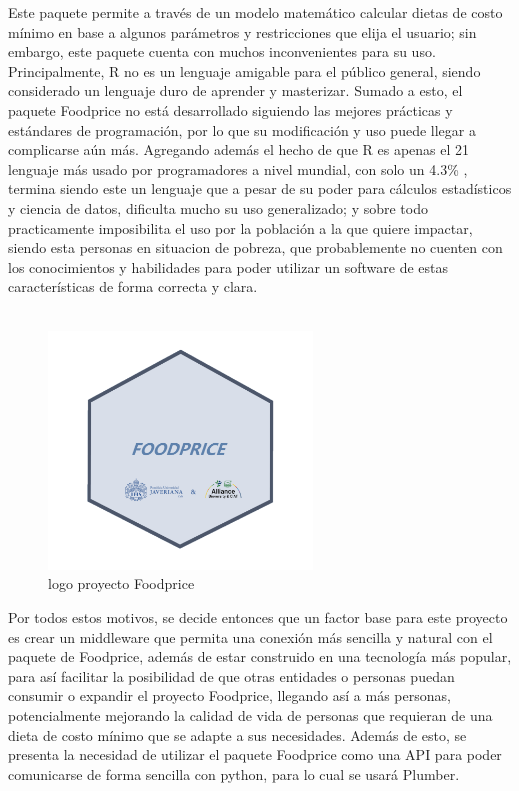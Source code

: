 Este paquete permite a trav\'es de un modelo matem\'atico calcular dietas de costo m\'inimo en base a algunos par\'ametros y restricciones que elija el usuario; sin embargo, este paquete cuenta con muchos inconvenientes para su uso. Principalmente, R no es un lenguaje amigable para el p\'ublico general, siendo considerado un lenguaje duro de aprender y masterizar\cite{HowLongDoes}. Sumado a esto, el paquete Foodprice no est\'a desarrollado siguiendo las mejores pr\'acticas y est\'andares de programaci\'on, por lo que su modificaci\'on y uso puede llegar a complicarse a\'un m\'as. Agregando adem\'as el hecho de que R es apenas el 21 lenguaje m\'as usado por programadores a nivel mundial, con solo un 4.3\% \cite{MostUsedLanguages}, termina siendo este un lenguaje que a pesar de su poder para c\'alculos estad\'isticos y ciencia de datos, dificulta mucho su uso generalizado; y sobre todo practicamente imposibilita el uso por la poblaci\'on a la que quiere impactar, siendo esta personas en situacion de pobreza, que probablemente no cuenten con los conocimientos y habilidades para poder utilizar un software de estas caracter\'isticas de forma correcta y clara.
\\
\\
\begin{figure}[H]
        \centering
        \includegraphics[width=7cm]{img/metodologia/Logotipo.png}
        \caption{logo proyecto Foodprice}
        \label{fig:logoFoodprice}
    \end{figure}

Por todos estos motivos, se decide entonces que un factor base para este proyecto es crear un middleware que permita una conexi\'on m\'as sencilla y natural con el paquete de Foodprice, adem\'as de estar construido en una tecnolog\'ia m\'as popular, para as\'i facilitar la posibilidad de que otras entidades o personas puedan consumir o expandir el proyecto Foodprice, llegando as\'i a m\'as personas, potencialmente mejorando la calidad de vida de personas que requieran de una dieta de costo m\'inimo que se adapte a sus necesidades. Adem\'as de esto, se presenta la necesidad de utilizar el paquete Foodprice como una API para poder comunicarse de forma sencilla con python, para lo cual se usar\'a Plumber.

